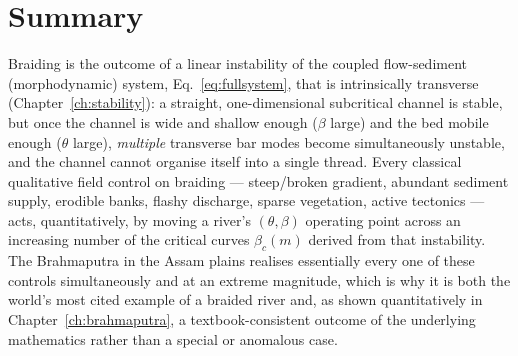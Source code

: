 \documentclass[11pt,a4paper]{report}
\theoremstyle{definition}
\theoremstyle{plain}
\theoremstyle{remark}
\begin{document}
\section{Summary}
Braiding is the outcome of a linear instability of the coupled flow-sediment (morphodynamic) system, Eq.~\eqref{eq:fullsystem}, that is intrinsically transverse (Chapter~\ref{ch:stability}): a straight, one-dimensional subcritical channel is stable, but once the channel is wide and shallow enough ($\beta$ large) and the bed mobile enough ($\theta$ large), \emph{multiple} transverse bar modes become simultaneously unstable, and the channel cannot organise itself into a single thread. Every classical qualitative field control on braiding --- steep/broken gradient, abundant sediment supply, erodible banks, flashy discharge, sparse vegetation, active tectonics --- acts, quantitatively, by moving a river's $(\theta,\beta)$ operating point across an increasing number of the critical curves $\beta_c(m)$ derived from that instability. The Brahmaputra in the Assam plains realises essentially every one of these controls simultaneously and at an extreme magnitude, which is why it is both the world's most cited example of a braided river and, as shown quantitatively in Chapter~\ref{ch:brahmaputra}, a textbook-consistent outcome of the underlying mathematics rather than a special or anomalous case.
\end{document}
